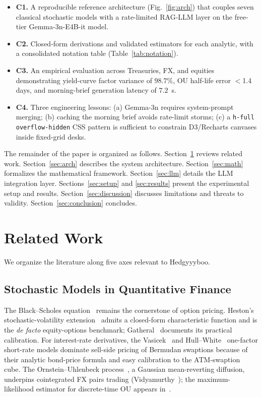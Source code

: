 \documentclass[conference]{IEEEtran}
\begin{document}
\begin{itemize}
\item \textbf{C1.} A reproducible reference architecture (Fig.~\ref{fig:arch}) that couples seven classical stochastic models with a rate-limited RAG-LLM layer on the free-tier Gemma-3n-E4B-it model.
\item \textbf{C2.} Closed-form derivations and validated estimators for each analytic, with a consolidated notation table (Table~\ref{tab:notation}).
\item \textbf{C3.} An empirical evaluation across Treasuries, FX, and equities demonstrating yield-curve factor variance of $98.7\%$, OU half-life error $<$1.4 days, and morning-brief generation latency of $7.2$~s.
\item \textbf{C4.} Three engineering lessons: (a) Gemma-3n requires system-prompt merging; (b) caching the morning brief avoids rate-limit storms; (c) a \texttt{h-full overflow-hidden} CSS pattern is sufficient to constrain D3/Recharts canvases inside fixed-grid desks.
\end{itemize}

\noindent The remainder of the paper is organized as follows. Section~\ref{sec:related} reviews related work. Section~\ref{sec:arch} describes the system architecture. Section~\ref{sec:math} formalizes the mathematical framework. Section~\ref{sec:llm} details the LLM integration layer. Sections~\ref{sec:setup} and \ref{sec:results} present the experimental setup and results. Section~\ref{sec:discussion} discusses limitations and threats to validity. Section~\ref{sec:conclusion} concludes.

\section{Related Work}
\label{sec:related}

We organize the literature along five axes relevant to Hedgyyyboo.

\subsection{Stochastic Models in Quantitative Finance}
The Black--Scholes equation~\cite{blackscholes1973} remains the cornerstone of option pricing. Heston's stochastic-volatility extension~\cite{heston1993} admits a closed-form characteristic function and is the \textit{de facto} equity-options benchmark; Gatheral~\cite{gatheral2006volatility} documents its practical calibration. For interest-rate derivatives, the Vasicek~\cite{vasicek1977} and Hull--White~\cite{hullwhite1990} one-factor short-rate models dominate sell-side pricing of Bermudan swaptions because of their analytic bond-price formula and easy calibration to the ATM-swaption cube. The Ornstein--Uhlenbeck process~\cite{uhlenbeck1930theory}, a Gaussian mean-reverting diffusion, underpins cointegrated FX pairs trading (Vidyamurthy~\cite{vidyamurthy2004pairs}); the maximum-likelihood estimator for discrete-time OU appears in~\cite{aitsahalia2002}.
\end{document}
